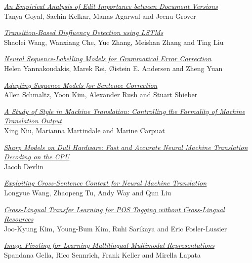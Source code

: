 \hyperlink{page.2763}{\em An Empirical Analysis of Edit Importance between Document Versions}\samepage \\
\hspace*{7mm} Tanya Goyal, Sachin Kelkar, Manas Agarwal and Jeenu Grover\dotfill {}

\hyperlink{page.2768}{\em Transition-Based Disfluency Detection using LSTMs}\samepage \\
\hspace*{7mm} Shaolei Wang, Wanxiang Che, Yue Zhang, Meishan Zhang and Ting Liu\dotfill {}

\hyperlink{page.2778}{\em Neural Sequence-Labelling Models for Grammatical Error Correction}\samepage \\
\hspace*{7mm} Helen Yannakoudakis, Marek Rei, {\O}istein E. Andersen and Zheng Yuan\dotfill {}

\hyperlink{page.2790}{\em Adapting Sequence Models for Sentence Correction}\samepage \\
\hspace*{7mm} Allen Schmaltz, Yoon Kim, Alexander Rush and Stuart Shieber\dotfill {}

\hyperlink{page.2797}{\em A Study of Style in Machine Translation: Controlling the Formality of Machine Translation Output}\samepage \\
\hspace*{7mm} Xing Niu, Marianna Martindale and Marine Carpuat\dotfill {}

\hyperlink{page.2803}{\em Sharp Models on Dull Hardware: Fast and Accurate Neural Machine Translation Decoding on the CPU}\samepage \\
\hspace*{7mm} Jacob Devlin\dotfill {}

\hyperlink{page.2809}{\em Exploiting Cross-Sentence Context for Neural Machine Translation}\samepage \\
\hspace*{7mm} Longyue Wang, Zhaopeng Tu, Andy Way and Qun Liu\dotfill {}

\hyperlink{page.2815}{\em Cross-Lingual Transfer Learning for POS Tagging without Cross-Lingual Resources}\samepage \\
\hspace*{7mm} Joo-Kyung Kim, Young-Bum Kim, Ruhi Sarikaya and Eric Fosler-Lussier\dotfill {}

\hyperlink{page.2822}{\em Image Pivoting for Learning Multilingual Multimodal Representations}\samepage \\
\hspace*{7mm} Spandana Gella, Rico Sennrich, Frank Keller and Mirella Lapata\dotfill {}

